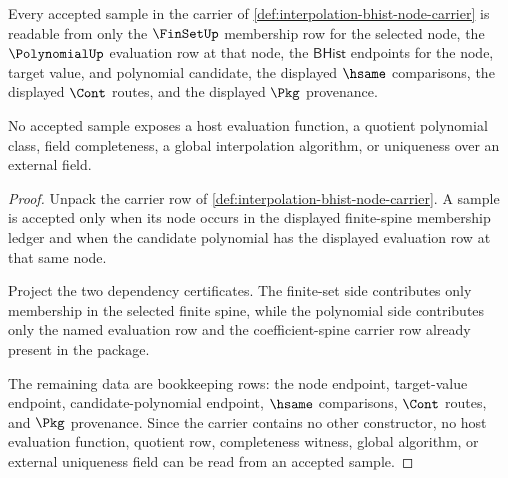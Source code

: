 \begin{theorem}
\label{thm:interpolation-sample-ledger-surface}
Every accepted sample in the carrier of
\autoref{def:interpolation-bhist-node-carrier} is readable from only the
$\FinSetUp$ membership row for the selected node, the $\PolynomialUp$
evaluation row at that node, the $\mathsf{BHist}$ endpoints for the node,
target value, and polynomial candidate, the displayed $\hsame$ comparisons,
the displayed $\Cont$ routes, and the displayed $\Pkg$ provenance.

No accepted sample exposes a host evaluation function, a quotient polynomial
class, field completeness, a global interpolation algorithm, or uniqueness over
an external field.
\end{theorem}
\begin{proof}
Unpack the carrier row of
\autoref{def:interpolation-bhist-node-carrier}. A sample is accepted only when
its node occurs in the displayed finite-spine membership ledger and when the
candidate polynomial has the displayed evaluation row at that same node.

Project the two dependency certificates. The finite-set side contributes only
membership in the selected finite spine, while the polynomial side contributes
only the named evaluation row and the coefficient-spine carrier row already
present in the package.

The remaining data are bookkeeping rows: the node endpoint, target-value
endpoint, candidate-polynomial endpoint, $\hsame$ comparisons, $\Cont$ routes,
and $\Pkg$ provenance. Since the carrier contains no other constructor, no
host evaluation function, quotient row, completeness witness, global algorithm,
or external uniqueness field can be read from an accepted sample.
\end{proof}

